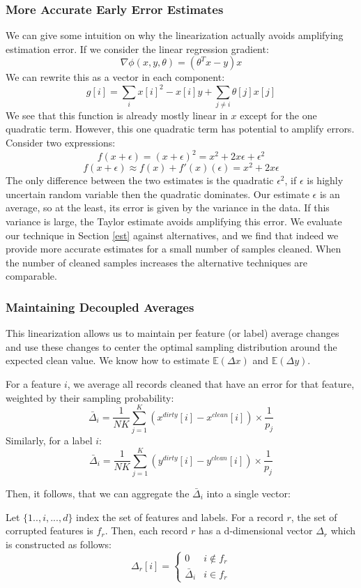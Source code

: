 \subsubsection{More Accurate Early Error Estimates}\label{acc}
We can give some intuition on why the linearization actually avoids amplifying estimation error.
If we consider the linear regression gradient:
\[
\nabla\phi(x,y,\theta) = (\theta^Tx - y)x
\]
We can rewrite this as a vector in each component:
\[
g[i] = \sum_{i} x[i]^2-x[i]y + \sum_{j \ne i} \theta[j]x[j]
\]
We see that this function is already mostly linear in $x$ except for the one quadratic term.
However, this one quadratic term has potential to amplify errors.
Consider two expressions:
\[
f(x+\epsilon) = (x+\epsilon)^2 = x^2 + 2x\epsilon + \epsilon^2
\]
\[
f(x+\epsilon) \approx f(x) + f'(x)(\epsilon) = x^2 + 2x\epsilon
\]
The only difference between the two estimates is the quadratic $\epsilon^2$, if $\epsilon$ is highly uncertain random variable then the quadratic dominates.
Our estimate $\epsilon$ is an average, so at the least, its error is given by the variance in the data.
If this variance is large, the Taylor estimate avoids amplifying this error.
We evaluate our technique in Section \ref{est} against alternatives, and we find that indeed we provide more accurate estimates for a small number of samples cleaned.
When the number of cleaned samples increases the alternative techniques are comparable.

\subsubsection{Maintaining Decoupled Averages}
This linearization allows us to maintain per feature (or label) average changes and use these changes to center the optimal sampling distribution around the expected clean value.
We know how to estimate $\mathbb{E}(\Delta x)$ and $\mathbb{E}(\Delta y)$.
\begin{lemma}
For a feature $i$, we average all records cleaned that have an error for that feature, weighted by their sampling probability:
\[
\bar{\Delta}_i = \frac{1}{NK}\sum_{j=1}^K (x^{dirty}[i]-x^{clean}[i])\times \frac{1}{p_j}
\]
Similarly, for a label $i$:
\[
\bar{\Delta}_i = \frac{1}{NK}\sum_{j=1}^K (y^{dirty}[i]-y^{clean}[i])\times \frac{1}{p_j}
\]
\end{lemma}

Then, it follows, that we can aggregate the $\bar{\Delta}_i$ into a single vector:
\begin{lemma}
Let $\{1..,i,...,d\}$ index the set of features and labels.
For a record $r$, the set of corrupted features is $f_r$.
Then, each record $r$ has a d-dimensional vector $\Delta_r$ which is constructed as follows:
\[
 \Delta_r[i] = \begin{cases} 0 & i \notin f_r \\ 
\bar{\Delta}_i & i \in f_r
\end{cases} 
\]
\end{lemma}

